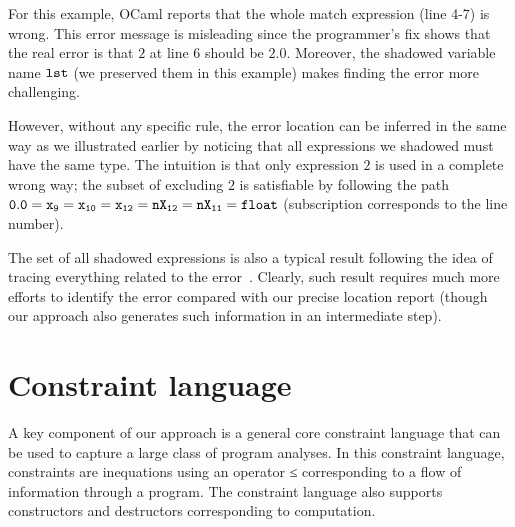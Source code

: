 For this example, OCaml reports that the whole match expression (line
4-7) is wrong. This error message is misleading since the programmer's
fix shows that the real error is that $2$ at line 6 should be $2.0$.
Moreover, the shadowed variable name $\mathtt{lst}$ (we preserved them in
this example) makes finding the error more challenging.

However, without any specific rule, the error location can be inferred
in the same way as we illustrated earlier by noticing that all
expressions we shadowed must have the same type. The intuition is that
only expression $2$ is used in a complete wrong way; the subset of
excluding $2$ is satisfiable by following the path
$\mathtt{0.0=x_{9}=x_{10}=x_{12}=nX_{12}=nX_{11}=float}$ (subscription
corresponds to the line number).

The set of all shadowed expressions is also a typical result following
the idea of tracing everything related to the
error~\cite{wand-errorfinding,choppella95, haack:slicing,
tip:slicing}. Clearly, such result requires much more efforts to
identify the error compared with our precise location report (though
our approach also generates such information in an intermediate step).

% 
% 
% 
% 
\section{Constraint language}
\label{sec:language}

A key component of our approach is a general core constraint language
that can be used to capture a large class of program analyses.
In this constraint language, constraints are inequations using an
operator ≤ corresponding
to a flow of information through a program. The constraint language
also supports constructors and destructors corresponding to
computation.


